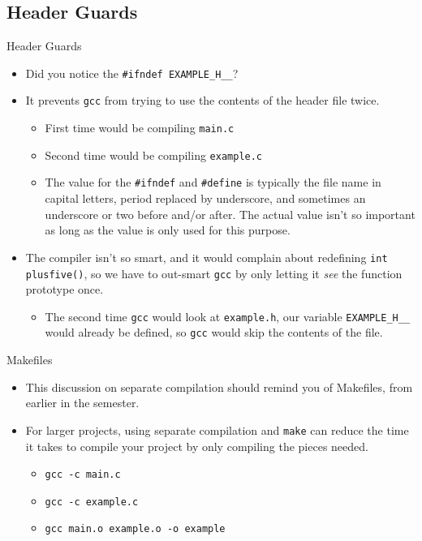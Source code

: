 \documentclass[graphics]{beamer}
\begin{document}
\subsection{Header Guards}
\begin{frame}{Header Guards}
    \begin{itemize}
        \item Did you notice the \texttt{\#ifndef EXAMPLE\_H\_\_}?
        \item It prevents \texttt{gcc} from trying to use the contents of the header file twice.
        \begin{itemize}
            \item First time would be compiling \texttt{main.c}
            \item Second time would be compiling \texttt{example.c}
            \item The value for the \texttt{\#ifndef} and \texttt{\#define} is typically the file name in capital letters, period replaced by underscore, and sometimes an underscore or two before and/or after. The actual value isn't so important as long as the value is only used for this purpose.
        \end{itemize}
        \item The compiler isn't so smart, and it would complain about redefining \texttt{int plusfive()}, so we have to out-smart \texttt{gcc} by only letting it \textit{see} the function prototype once.
        \begin{itemize}
            \item The second time \texttt{gcc} would look at \texttt{example.h}, our variable \texttt{EXAMPLE\_H\_\_} would already be defined, so \texttt{gcc} would skip the contents of the file.
        \end{itemize}
    \end{itemize}
\end{frame}

\begin{frame}{Makefiles}
    \begin{itemize}
        \item This discussion on separate compilation should remind you of Makefiles, from earlier in the semester.
        \item For larger projects, using separate compilation and \texttt{make} can reduce the time it takes to compile your project by only compiling the pieces needed.
        \begin{itemize}
            \item \texttt{gcc -c main.c}
            \item \texttt{gcc -c example.c}
            \item \texttt{gcc main.o example.o -o example}
        \end{itemize}
    \end{itemize}
\end{frame}
\end{document}
